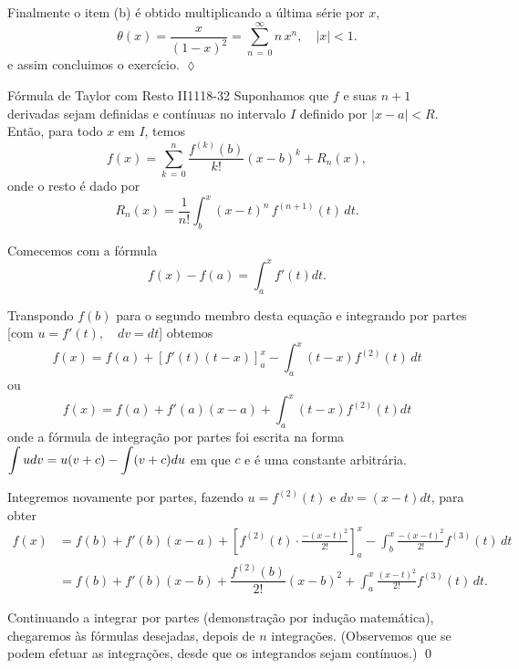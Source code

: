 Finalmente o item (b) é obtido multiplicando a última série por \(x\), 
\begin{equation*}
\theta(x)=\dfrac{x}{(1-x)^{2}}= \sum_{n\,=\,0}^{\infty}n\,x^{n}, \quad |x|<1.
\end{equation*}
e assim concluimos o exercício. \hfill \(\lozenge\)


\begin{theoc}{Fórmula de Taylor com Resto II}{1118-32}
Suponhamos que $f$ e suas $n + 1$ derivadas sejam definidas e contínuas no intervalo $I$ definido por $|x - a| < R$. Então, para todo $x$ em $I$, temos
\begin{equation}\label{1118-15}
  f(x)=\sum_{k\, =\, 0}^{n}\dfrac{f^{(k)}(b)}{k!}(x-b)^k+R_n(x),  
\end{equation}
onde o resto é dado por
\begin{equation}\label{1118-16}
R_n(x)=\dfrac{1}{n!}\int_{b}^x(x-t)^n\,f^{(n+1)}(t)\,dt.
\end{equation} 
\end{theoc}

\prova Comecemos com a fórmula
\begin{equation*}
  f(x) - f(a)=\int_a^xf'(t) dt.
\end{equation*}

Transpondo $f(b)$ para o segundo membro desta equação e integrando
por partes [com $u = f'(t),\quad dv = dt$] obtemos
\begin{equation*}
  f(x) = f(a) + [f'(t)(t - x)]^x_a - \int_a^x(t-x)f^{(2)}(t)\, dt
\end{equation*}
ou
\begin{equation*}
  f(x) = f(a) + f'(a)(x - a) +\int_a^x(t-x)f^{(2)}(t) dt
\end{equation*}
onde a fórmula de integração por partes foi escrita na forma
$\displaystyle{\int u dv = u(v + c) - \int(v + c)du}$ em que $c$ e é uma
constante arbitrária.

Integremos novamente por partes, fazendo $u=f^{(2)}(t)$ e $dv =(x
- t) dt$, para obter
\begin{align*}
  f(x)&=f(b)+ f'(b)(x - a)+\left[ f^{(2)}(t)\cdot\frac{-(x-t)^2}{2!} \right]_a^x
  -\int_b^x\frac{-(x-t)^2}{2!}f^{(3)}(t)\, dt  \\[2ex]
   & =f(b)+f'(b)(x-b)+\dfrac{f^{(2)}(b)}{2!}(x-b)^2+
   \int_a^x\frac{(x-t)^2}{2!}f^{(3)}(t)\, dt.
\end{align*}

Continuando a integrar por partes (demonstração por indução
matemática), chegaremos às fórmulas desejadas, depois de $n$
integrações. (Observemos que se podem efetuar as integrações,
desde que os integrandos sejam contínuos.) \qed


